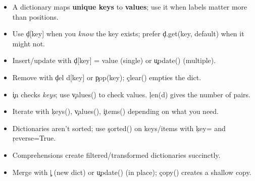 \begin{tcolorbox}[%
    colframe=orange,
    colback = white,
    arc=2mm %
 ]
\begin{itemize}
  \item A dictionary maps \textbf{unique keys} to \textbf{values}; use it when labels matter more than positions.
  \item Use \c{d[key]} when you \emph{know} the key exists; prefer \c{d.get(key, default)} when it might not.
  \item Insert/update with \c{d[key] = value} (single) or \c{update()} (multiple).
  \item Remove with \c{del d[key]} or \c{pop(key)}; \c{clear()} empties the dict.
  \item \c{in} checks \emph{keys}; use \c{values()} to check values. \c{len(d)} gives the number of pairs.
  \item Iterate with \c{keys()}, \c{values()}, \c{items()} depending on what you need.
  \item Dictionaries aren’t sorted; use \c{sorted()} on keys/items with \c{key=} and \c{reverse=True}.
  \item Comprehensions create filtered/transformed dictionaries succinctly.
  \item Merge with \c{|} (new dict) or \c{update()} (in place); \c{copy()} creates a shallow copy.
\end{itemize}
\end{tcolorbox}